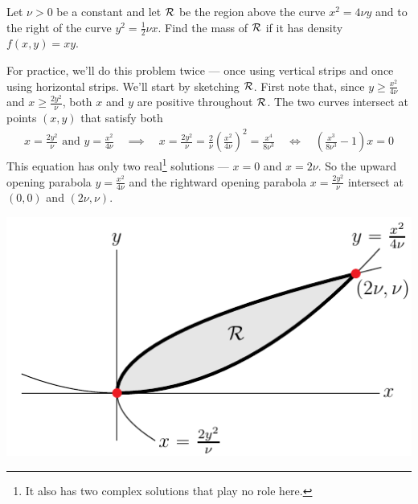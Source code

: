 \begin{eg}[Mass]\label{eg dblInt A}
Let $\nu>0$ be a constant and let $\mathcal{R}$ be the region above the curve 
$x^2=4\nu y$ and to the right of the curve $y^2=\frac{1}{2}\nu x$. 
Find the mass of $\mathcal{R}$ if it has density $f(x,y)=xy$.

\soln For practice, we'll do this problem twice --- once using vertical 
strips and once using horizontal strips. We'll start by sketching $\mathcal{R}$.
First note that, since $y\ge\frac{x^2}{4\nu}$ and $x\ge \frac{2y^2}{\nu}$, 
both $x$ and $y$ are positive throughout $\mathcal{R}$.
The two curves intersect at points $(x,y)$ that satisfy both
\begin{align*}
x = \frac{2y^2}{\nu}\text{ and }y=\frac{x^2}{4\nu}
\quad\implies\quad x  = \frac{2y^2}{\nu} = \frac{2}{\nu}\left(\frac{x^2}{4\nu}\right)^2
                 = \frac{x^4}{8\nu^3}
\quad\iff\quad \left(\frac{x^3}{8\nu^3}-1\right)x=0
\end{align*}
This equation has only two real\footnote{It also has two complex solutions that
play no role here.} solutions --- $x=0$ and $x=2\nu$.
So the upward opening parabola $y = \frac{x^2}{4\nu}$ and the 
rightward opening parabola $x=\frac{2y^2}{\nu}$  intersect at $(0,0)$ and $(2\nu,\nu)$.
\begin{efig}
\begin{center}
   \includegraphics{dblIntAa.pdf}
\end{center}
\end{efig}



\end{eg}
